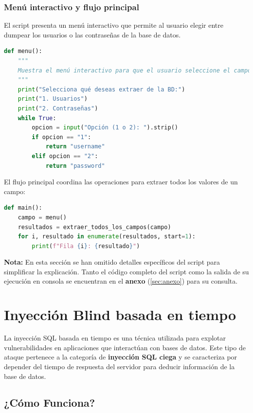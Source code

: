 \documentclass[a4paper,12pt]{article}
\begin{document}
\subsubsection{Menú interactivo y flujo principal}

El script presenta un menú interactivo que permite al usuario elegir entre dumpear los usuarios o las contraseñas de la base de datos.

\begin{lstlisting}[language=Python]
def menu():
    """
    Muestra el menú interactivo para que el usuario seleccione el campo a extraer.
    """
    print("Selecciona qué deseas extraer de la BD:")
    print("1. Usuarios")
    print("2. Contraseñas")
    while True:
        opcion = input("Opción (1 o 2): ").strip()
        if opcion == "1":
            return "username"
        elif opcion == "2":
            return "password"
\end{lstlisting}

El flujo principal coordina las operaciones para extraer todos los valores de un campo:

\begin{lstlisting}[language=Python]
def main():
    campo = menu()
    resultados = extraer_todos_los_campos(campo)
    for i, resultado in enumerate(resultados, start=1):
        print(f"Fila {i}: {resultado}")
\end{lstlisting}

\textbf{Nota:} En esta sección se han omitido detalles específicos del script para simplificar la explicación. Tanto el código completo del script como la salida de su ejecución en consola se encuentran en el \textbf{anexo} (\ref{sec:anexo}) para su consulta.




\section{Inyección Blind basada en tiempo}

La inyección SQL basada en tiempo es una técnica utilizada para explotar vulnerabilidades en aplicaciones que interactúan con bases de datos. Este tipo de ataque pertenece a la categoría de \textbf{inyección SQL ciega} y se caracteriza por depender del tiempo de respuesta del servidor para deducir información de la base de datos.

\subsection{¿Cómo Funciona?}
\end{document}
